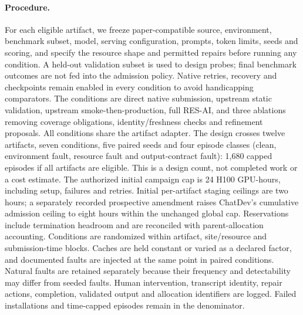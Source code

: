 \documentclass[pdflatex,sn-mathphys-num]{sn-jnl}
\theoremstyle{thmstylethree}
\newcommand{\tool}{\textsc{RES-AI}}
\begin{document}
\paragraph{Procedure.} For each eligible artifact, we freeze paper-compatible source, environment, benchmark subset, model, serving configuration, prompts, token limits, seeds and scoring, and specify the resource shape and permitted repairs before running any condition. A held-out validation subset is used to design probes; final benchmark outcomes are not fed into the admission policy. Native retries, recovery and checkpoints remain enabled in every condition to avoid handicapping comparators. The conditions are direct native submission, upstream static validation, upstream smoke-then-production, full \tool{}, and three ablations removing coverage obligations, identity/freshness checks and refinement proposals. All conditions share the artifact adapter. The design crosses twelve artifacts, seven conditions, five paired seeds and four episode classes (clean, environment fault, resource fault and output-contract fault): 1,680 capped episodes if all artifacts are eligible. This is a design count, not completed work or a cost estimate. The authorized initial campaign cap is 24 H100 GPU-hours, including setup, failures and retries. Initial per-artifact staging ceilings are two hours; a separately recorded prospective amendment raises ChatDev's cumulative admission ceiling to eight hours within the unchanged global cap. Reservations include termination headroom and are reconciled with parent-allocation accounting. Conditions are randomized within artifact, site/resource and submission-time blocks. Caches are held constant or varied as a declared factor, and documented faults are injected at the same point in paired conditions. Natural faults are retained separately because their frequency and detectability may differ from seeded faults. Human intervention, transcript identity, repair actions, completion, validated output and allocation identifiers are logged. Failed installations and time-capped episodes remain in the denominator.
\end{document}
